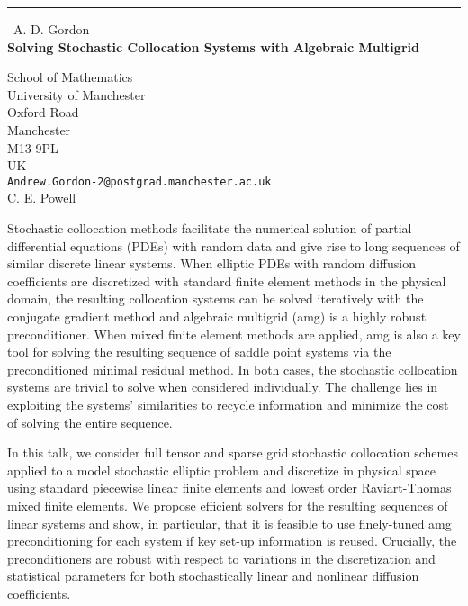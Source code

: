 \documentclass{report}
\begin{document}
\begin{center}
\rule{6in}{1pt} \
{\large A. D. Gordon \\
{\bf Solving Stochastic Collocation Systems with Algebraic Multigrid}}

School of Mathematics \\ University of Manchester \\ Oxford Road \\ Manchester \\ M13 9PL \\ UK
\\
{\tt Andrew.Gordon-2@postgrad.manchester.ac.uk}\\
C. E. Powell\end{center}

Stochastic collocation methods facilitate the numerical solution of
partial differential equations (PDEs) with random data and give rise to
long sequences of similar discrete linear systems. When elliptic PDEs
with random diffusion coefficients are discretized with standard finite
element methods in the physical domain, the resulting collocation systems
can be solved iteratively with the conjugate gradient method and
algebraic multigrid (amg) is a highly robust preconditioner. When mixed
finite element methods are applied, amg is also a key tool for solving
the resulting sequence of saddle point systems via the preconditioned
minimal residual method. In both cases, the stochastic collocation
systems are trivial to solve when considered individually. The challenge
lies in exploiting the systems' similarities to recycle information and
minimize the cost of solving the entire sequence.

In this talk, we consider full tensor and sparse grid stochastic
collocation schemes applied to a model stochastic elliptic problem and
discretize in physical space using standard piecewise linear finite
elements and lowest order Raviart-Thomas mixed finite elements. We
propose efficient solvers for the resulting sequences of linear systems
and show, in particular, that it is feasible to use finely-tuned amg
preconditioning for each system if key set-up information is reused.
Crucially, the preconditioners are robust with respect to variations in
the discretization and statistical parameters for both stochastically
linear and nonlinear diffusion coefficients.
\end{document}
